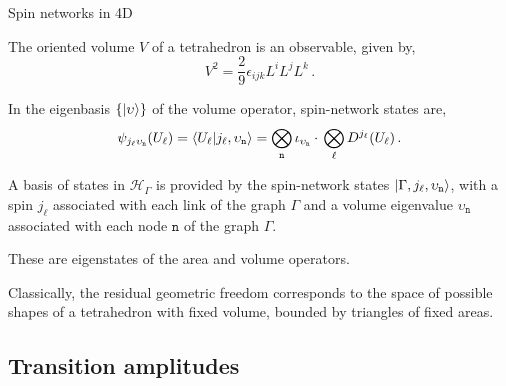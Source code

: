 \documentclass[12pt,titlepage]{article}
\begin{document}
\begin{frame}{Spin networks in 4D}
    \begin{list}{\,}{\leftmargin=1em \itemindent=0em}
        \item<1-> The oriented volume $V$ of a tetrahedron is an observable, given by,
        \begin{equation}
            V^2=\frac{2}{9}\epsilon_{ijk}L^i L^j L^k \,.
        \end{equation}
        \item<2-> In the eigenbasis $\{\ket{\upsilon}\}$ of the volume operator, spin-network states are,
        \begin{equation}
            \psi_{j_\ell \upsilon_\mathtt{n}}(U_\ell)= \braket{U_\ell}{j_\ell,\upsilon_\mathtt{n}}=\bigotimes_\mathtt{n}\iota_{\upsilon_\mathtt{n}}\cdot\,\bigotimes_\ell D^{j_\ell}(U_\ell)\,.
        \end{equation}
        \item<3-> A basis of states in $\mathcal{H}_\Gamma$ is provided by the spin-network states $\ket{\Gamma,j_\ell,\upsilon_\mathtt{n}}$, with a spin $j_\ell$ associated with each link of the graph $\Gamma$ and a volume eigenvalue $\upsilon_\mathtt{n}$ associated with each node $\mathtt{n}$ of the graph $\Gamma$.
        \item<4-> These are eigenstates of the area and volume operators.
        \item<5-> Classically, the residual geometric freedom corresponds to the space of possible shapes of a tetrahedron with fixed volume, bounded by triangles of fixed areas.
    \end{list}
\end{frame}

\subsection{Transition amplitudes}
\end{document}
